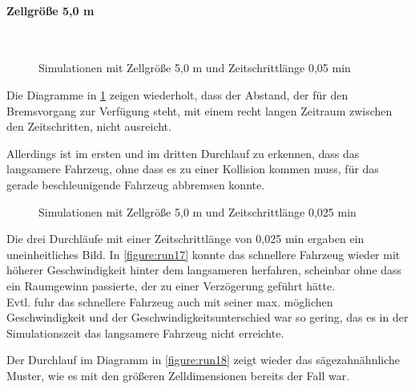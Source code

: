 \paragraph*{Zellgröße 5,0 m}
\hfill \\
\begin{figure}[hptb]
  \centering 
   \qquad 
   \qquad 
  \caption{Simulationen mit Zellgröße 5,0 m und Zeitschrittlänge 0,05 min} 
  \label{figure:run14-16}
\end{figure}

Die Diagramme in \cref{figure:run14-16} zeigen wiederholt, dass der Abstand, der für den Bremsvorgang zur Verfügung steht, mit einem recht langen Zeitraum zwischen den Zeitschritten, nicht ausreicht.

Allerdings ist im ersten und im dritten Durchlauf zu erkennen, dass das langsamere Fahrzeug, ohne dass es zu einer Kollision kommen muss, für das gerade beschleunigende Fahrzeug abbremsen konnte. 

\begin{figure}[hptb]
  \centering 
   \qquad 
   \qquad 
  \caption{Simulationen mit Zellgröße 5,0 m und Zeitschrittlänge 0,025 min} 
  \label{figure:run17-19}
\end{figure}

Die drei Durchläufe mit einer Zeitschrittlänge von 0,025 min ergaben ein uneinheitliches Bild.
In \cref{figure:run17} konnte das schnellere Fahrzeug wieder mit höherer Geschwindigkeit hinter dem langsameren herfahren, scheinbar ohne dass ein Raumgewinn passierte, der zu einer Verzögerung geführt hätte.
\\
Evtl. fuhr das schnellere Fahrzeug auch mit seiner max. möglichen Geschwindigkeit und der Geschwindigkeitsunterschied war so gering, das es in der Simulationszeit das langsamere Fahrzeug nicht erreichte.

Der Durchlauf im Diagramm in \cref{figure:run18} zeigt wieder das sägezahnähnliche Muster, wie es mit den größeren Zelldimensionen bereits der Fall war.

